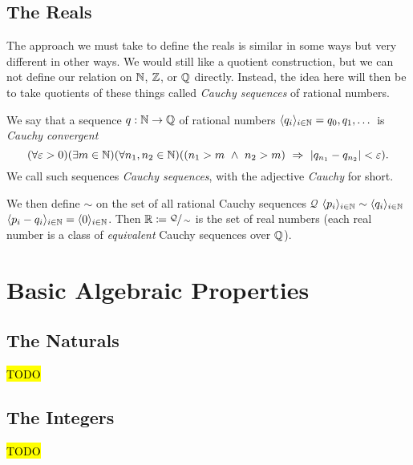 \section{The Reals}
The approach we must take to define the reals is similar in some ways but very different in other ways.
We would still like a quotient construction,
but we can not define our relation on $\mathbb{N}$, $\mathbb{Z}$, or $\mathbb{Q}$ directly.
Instead, the idea here will then be to take quotients of these things called
\emph{Cauchy sequences} of rational numbers.

\begin{definition}\label{def:cauchy}
    We say that a sequence $q: \mathbb{N} \to \mathbb{Q}$
    of rational numbers $\langle q_i \rangle_{i \in \mathbb{N}} = q_0, q_1, \dots $
    is \emph{Cauchy convergent} {\ifandonlyif}
    \[
        \pn*{\forall \varepsilon > 0}\pn*{\exists m \in \N}\pn*{\forall n_1, n_2 \in \N}
        \pn*{\pn*{n_1 > m~\meet~n_2 > m} \implies \abs{q_{n_1} - q_{n_2}} < \varepsilon}.
    \]
    We call such sequences \emph{Cauchy sequences}, with the adjective \emph{Cauchy} for short.
\end{definition}

We then define $\sim$ on the set of all rational Cauchy sequences $\mathcal{Q}$
$\langle p_i \rangle_{i \in \mathbb{N}} \sim \langle q_i \rangle_{i \in \mathbb{N}}$ \iffbydefn
$\langle p_i - q_i \rangle_{i \in \mathbb{N}} = \langle 0 \rangle_{i \in \mathbb{N}}$.
Then $\mathbb{R} \coloneqq \sfrac{\mathcal{Q}}{\sim}$ is the set of real numbers
(\ie each real number is a class of \emph{equivalent} Cauchy sequences over $\mathbb{Q}$).



\chapter{Basic Algebraic Properties}
\section{The Naturals}
\begin{theorem}
    \hl{TODO}
\end{theorem}

\section{The Integers}
\begin{theorem}
    \hl{TODO}
\end{theorem}

